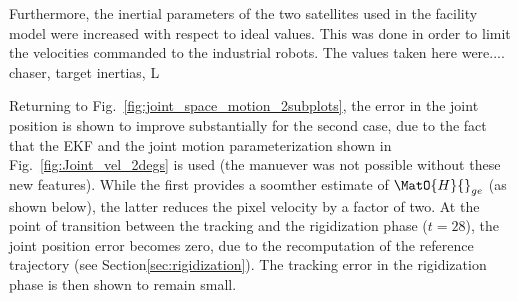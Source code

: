 Furthermore, the inertial parameters of the two satellites used in the facility model were increased with respect to ideal values. This was done in order to limit the velocities commanded to the industrial robots. The values taken here were.... chaser, target inertias, L

Returning to Fig.~\ref{fig:joint_space_motion_2subplots}, the error in the joint position is shown to improve substantially for the second case, due to the fact that the EKF and the joint motion parameterization shown in Fig.~\ref{fig:Joint_vel_2degs} is used (the manuever was not possible without these new features). While the first provides a soomther estimate of $\MatO{H}{}_{ge}$ (as shown below), the latter reduces the pixel velocity by a factor of two. At the point of transition between the tracking and the rigidization phase ($t=28$), the joint position error becomes zero, due to the recomputation of the reference trajectory (see Section\ref{sec:rigidization}). The tracking error in the rigidization phase is then shown to remain small.

